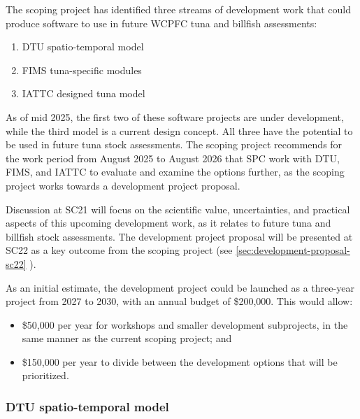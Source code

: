 \documentclass{SCreport}
\begin{document}
\vspace{2ex}

The scoping project has identified three streams of development work that could
produce software to use in future WCPFC tuna and billfish assessments:

\begin{enumerate}
  \item DTU spatio-temporal model\\[-4.5ex]
  \item FIMS tuna-specific modules\\[-4.5ex]
  \item IATTC designed tuna model
\end{enumerate}

As of mid 2025, the first two of these software projects are under development,
while the third model is a current design concept. All three have the potential
to be used in future tuna stock assessments. The scoping project recommends for
the work period from August 2025 to August 2026 that SPC work with DTU, FIMS,
and IATTC to evaluate and examine the options further, as the scoping project
works towards a development project proposal.

Discussion at SC21 will focus on the scientific value, uncertainties, and
practical aspects of this upcoming development work, as it relates to future
tuna and billfish stock assessments. The development project proposal will be
presented at SC22 as a key outcome from the scoping project
(see \autoref{sec:development-proposal-sc22} ).

As an initial estimate, the development project could be launched as a
three-year project from 2027 to 2030, with an annual budget of \$200,000. This
would allow:

\begin{itemize}
  \item \$50,000 per year for workshops and smaller development subprojects, in
  the same manner as the current scoping project; and
  \item \$150,000 per year to divide between the development options that will
  be prioritized.
\end{itemize}

\vspace{2ex}

\subsubsection{DTU spatio-temporal model}
\label{sec:dtu-development-project}
\end{document}
